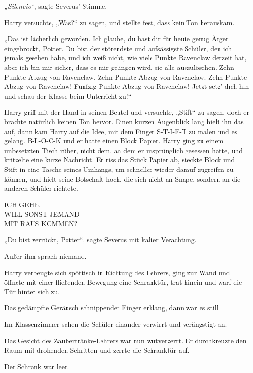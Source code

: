 \emph{„Silencio“}, sagte Severus’ Stimme. 

Harry versuchte, „Was?“ zu sagen, und stellte fest, dass kein Ton herauskam. 

„Das ist lächerlich geworden. Ich glaube, du hast dir für heute genug Ärger eingebrockt, Potter. Du bist der störendste und aufsässigste Schüler, den ich jemals gesehen habe, und ich weiß nicht, wie viele Punkte Ravenclaw derzeit hat, aber ich bin mir sicher, dass es mir gelingen wird, sie alle auszulöschen. Zehn Punkte Abzug von Ravenclaw. Zehn Punkte Abzug von Ravenclaw. Zehn Punkte Abzug von Ravenclaw! Fünfzig Punkte Abzug von Ravenclaw! Jetzt setz’ dich hin und schau der Klasse beim Unterricht zu!“ 

Harry griff mit der Hand in seinen Beutel und versuchte, „Stift“ zu sagen, doch er brachte natürlich keinen Ton hervor. Einen kurzen Augenblick lang hielt ihn das auf, dann kam Harry auf die Idee, mit dem Finger S-T-I-F-T zu malen und es gelang. B-L-O-C-K und er hatte einen Block Papier. Harry ging zu einem unbesetzten Tisch rüber, nicht dem, an dem er ursprünglich gesessen hatte, und kritzelte eine kurze Nachricht. Er riss das Stück Papier ab, steckte Block und Stift in eine Tasche seines Umhangs, um schneller wieder darauf zugreifen zu können, und hielt seine Botschaft hoch, die sich nicht an Snape, sondern an die anderen Schüler richtete. 

\begin{writtenNote}
ICH GEHE.\\
WILL SONST JEMAND\\
MIT RAUS KOMMEN?
\end{writtenNote}

„Du bist verrückt, Potter“, sagte Severus mit kalter Verachtung. 

Außer ihm sprach niemand. 

Harry verbeugte sich spöttisch in Richtung des Lehrers, ging zur Wand und öffnete mit einer fließenden Bewegung eine Schranktür, trat hinein und warf die Tür hinter sich zu. 

Das gedämpfte Geräusch schnippender Finger erklang, dann war es still. 

Im Klassenzimmer sahen die Schüler einander verwirrt und verängstigt an. 

Das Gesicht des Zaubertränke-Lehrers war nun wutverzerrt. Er durchkreuzte den Raum mit drohenden Schritten und zerrte die Schranktür auf. 

Der Schrank war leer. 

\later 

